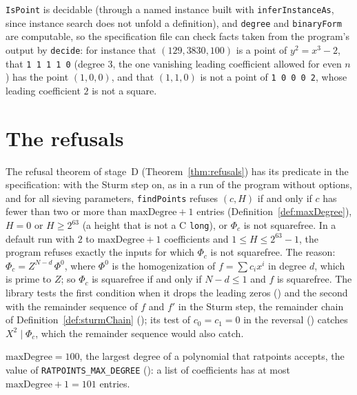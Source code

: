 \verb|IsPoint| is decidable (through a named instance built with \verb|inferInstanceAs|, since
instance search does not unfold a definition), and \verb|degree| and \verb|binaryForm| are
computable, so the specification file can check facts taken from the program's output by
\verb|decide|: for instance that $(129, 3830, 100)$ is a point of $y^2 = x^3 - 2$, that
\verb|1 1 1 1 0| (degree $3$, the one vanishing leading coefficient allowed for even $n$) has the
point $(1, 0, 0)$, and that $(1, 1, 0)$ is not a point of \verb|1 0 0 0 2|, whose leading
coefficient $2$ is not a square.

\section{The refusals}\label{sec:refusals}

The refusal theorem of stage~D (Theorem~\ref{thm:refusals}) has its predicate in the specification:
with the Sturm step on, as in a run of the program without options, and for all sieving parameters,
\verb|findPoints| refuses $(c, H)$ if and only if $c$ has fewer than two or more than
$\mathrm{maxDegree} + 1$ entries (Definition~\ref{def:maxDegree}), $H = 0$ or $H \ge 2^{63}$ (a
height that is not a C \verb|long|), or $\Phi_c$ is not squarefree. In a default run with $2$ to
$\mathrm{maxDegree} + 1$ coefficients and $1 \le H \le 2^{63} - 1$, the program refuses exactly the
inputs for which $\Phi_c$ is not squarefree. The reason: $\Phi_c = Z^{N - d}\, \Phi^0$, where
$\Phi^0$ is the homogenization of $f = \sum c_i x^i$ in degree $d$, which is prime to $Z$; so
$\Phi_c$ is squarefree if and only if $N - d \le 1$ and $f$ is squarefree. The library tests the
first condition when it drops the leading zeros () and the second
with the remainder sequence of $f$ and $f'$ in the Sturm step, the remainder chain of
Definition~\ref{def:sturmChain} (); its test of $c_0 = c_1 = 0$ in the
reversal () catches $X^2 \mid \Phi_c$, which the remainder
sequence would also catch.

\begin{definition}\label{def:maxDegree}
  \leanok
  $\mathrm{maxDegree} = 100$, the largest degree of a polynomial that ratpoints accepts, the value
  of \verb|RATPOINTS_MAX_DEGREE| (): a list of coefficients has at
  most $\mathrm{maxDegree} + 1 = 101$ entries.
\end{definition}

